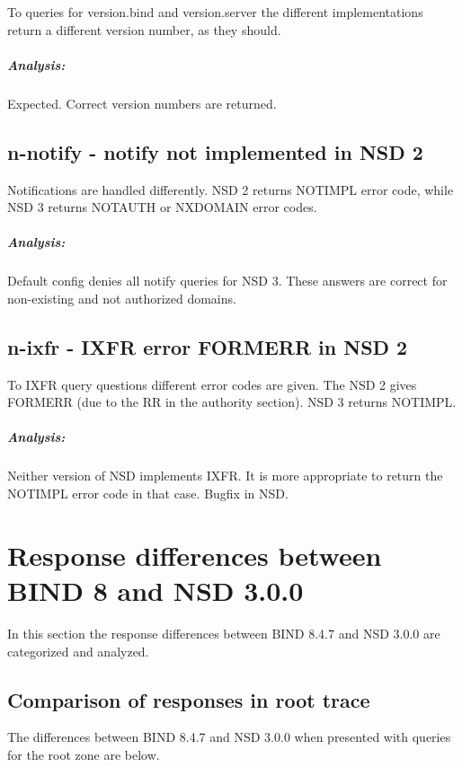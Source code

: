 \documentclass[twoside,titlepage,english]{nlnetlabs}
\begin{document}
To queries for version.bind and version.server the different implementations
return a different version number, as they should.

\vspace{-8pt}\subparagraph{Analysis:}

Expected. Correct version numbers are returned.


\subsection{n-notify - notify not implemented in NSD 2}
\label{n-notify}

Notifications are handled differently. NSD 2 returns NOTIMPL error code,
while NSD 3 returns NOTAUTH or NXDOMAIN error codes.

\vspace{-8pt}\subparagraph{Analysis:}

Default config denies all notify queries for NSD 3. These answers are correct
for non-existing and not authorized domains.


\subsection{n-ixfr - IXFR error FORMERR in NSD 2}
\label{n-ixfr}

To IXFR query questions different error codes are given. The NSD 2
gives FORMERR (due to the RR in the authority section). NSD 3 returns
NOTIMPL. 

\vspace{-8pt}\subparagraph{Analysis:}

Neither version of NSD implements IXFR. It is more appropriate to
return the NOTIMPL error code in that case. Bugfix in NSD.


\section{Response differences between BIND 8 and NSD 3.0.0}

In this section the response differences between BIND 8.4.7 and NSD 3.0.0
are categorized and analyzed.


\subsection{Comparison of responses in root trace}

The differences between BIND 8.4.7 and NSD 3.0.0 when presented
with queries for the root zone are below.
\end{document}
